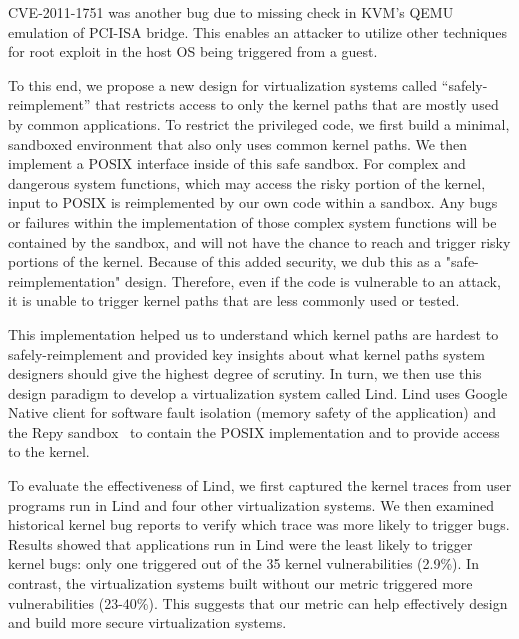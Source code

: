 CVE-2011-1751 was another bug due to missing check in KVM's QEMU emulation of PCI-ISA bridge. This enables an attacker to utilize other techniques \cite{Virtunoid} for root exploit in the host OS being triggered from a guest.

To this end, we propose a new design for virtualization 
systems called ``safely-reimplement'' that restricts access to only the
kernel paths that are mostly used by common applications.  To restrict the privileged
code, we first build a minimal, sandboxed environment that also only uses 
common kernel paths.
We then implement a POSIX interface inside of this safe sandbox. For complex and dangerous system functions, which may access the risky portion of the kernel, 
input to POSIX is reimplemented by our own code within a sandbox. Any bugs or failures within the implementation of those complex system functions 
will be contained by the sandbox, and will not have the chance to reach 
and trigger risky portions of the kernel. Because of this added security, we dub this as a "safe-reimplementation" design.  Therefore, even if the code
is vulnerable to an attack, it is unable to trigger
kernel paths that are less commonly used or tested.

This implementation helped us to understand which kernel paths are hardest to
safely-reimplement and provided key insights about what kernel paths system
designers should give the highest degree of scrutiny. In turn, we then use this design paradigm to develop a virtualization system called
Lind.  Lind uses Google Native client for software fault isolation (memory
safety of the application) and the Repy sandbox~\cite{Repy-10} to contain the POSIX
implementation and to provide access to the kernel.   

To evaluate the effectiveness of Lind, we first captured the 
kernel traces from user programs run in Lind and four other virtualization
systems.
We then examined historical
kernel bug reports to verify which trace was more likely to trigger bugs.
Results showed that applications run in Lind were the least likely to
trigger kernel bugs: only one triggered out of the 35 kernel vulnerabilities 
(2.9\%). In contrast, the virtualization systems built
without our metric triggered more vulnerabilities (23-40\%). This
suggests that our metric can help effectively design and build more secure
virtualization systems.


